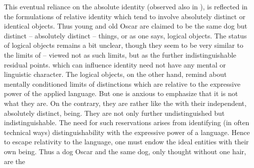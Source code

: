 This eventual reliance on the absolute identity (observed also in
\citeauthor{McGinn}), is reflected in the formulations of relative identity
which tend to involve absolutely distinct or identical objects. Thus young and
old Oscar are claimed to be the same dog but distinct -- absolutely distinct --
things, or as one says, logical objects.  The status of logical objects remains
a bit unclear, though they seem to be very similar to the limits of
 -- viewed not as  such limits, but as the further
indistinguishable residual points.   which can influence
identity need not have any mental or linguistic character.  The logical objects,
on the other hand, remind about mentally conditioned limits of distinctions
which are relative to the expressive power of the applied language.  But one is
anxious to emphasize that it is not what they are. On the contrary, they are
rather like the  with their independent, absolutely distinct,
being. They are not only further undistinguished but indistinguishable. The need
for such reservations arises from identifying (in often technical ways)
distinguishability with the expressive power of a language. Hence to escape
relativity to the language, one must endow the ideal entities with their own
being. Thus a dog Oscar and the same dog, only thought without one hair, are the
